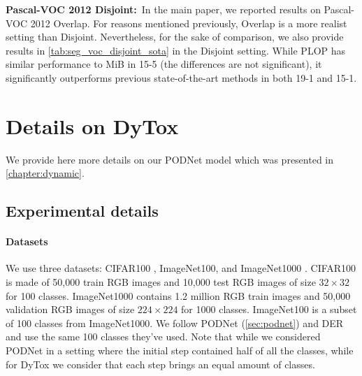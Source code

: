 

\noindent\textbf{Pascal-VOC 2012 Disjoint:\,} In the main paper, we reported results on Pascal-VOC
2012 Overlap. For reasons mentioned previously, Overlap is a more realist setting than Disjoint.
Nevertheless, for the sake of comparison, we also provide results in
\autoref{tab:seg_voc_disjoint_sota} in the Disjoint setting. While PLOP has similar performance to
MiB in 15-5 (the differences are not significant), it significantly outperforms previous
state-of-the-art methods in both 19-1 and 15-1.



\section{Details on DyTox}
\label{sec:appendix_dytox}

We provide here more details on our PODNet model which was presented in \autoref{chapter:dynamic}.

%


\subsection{Experimental details}

\paragraph{Datasets} We use three datasets: CIFAR100 \citep{krizhevskycifar100}, ImageNet100, and
ImageNet1000 \citep{deng2009imagenet}. CIFAR100 is made of 50,000 train RGB images and 10,000 test
RGB images of size $32\times32$ for 100 classes. ImageNet1000 contains 1.2 million RGB train images
and 50,000 validation RGB images of size $224\times224$ for 1000 classes. ImageNet100 is a subset of
100 classes from ImageNet1000. We follow PODNet (\autoref{sec:podnet}) and DER \citep{yan2021der}
and use the same 100 classes they've used. Note that while we considered PODNet in a setting where
the initial step contained half of all the classes, while for DyTox we consider that each step
brings an equal amount of classes.

